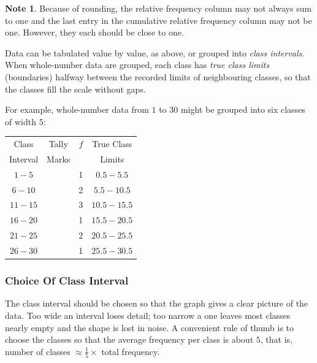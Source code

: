 \documentclass[11pt,a4paper]{article}
\newcommand{\tallystroke}[1]{\draw[line width=.7pt] (#1*0.16,0) -- (#1*0.16,0.32);}
\newcommand{\tallybox}[1]{%
  \raisebox{-0.02em}{\begin{tikzpicture}[baseline=0pt,inner sep=0pt]#1\end{tikzpicture}}%
}
\newcommand{\StrokeOne}  {\tallybox{\tallystroke{0}}}
\newcommand{\StrokeTwo}  {\tallybox{\tallystroke{0}\tallystroke{1}}}
\newcommand{\StrokeThree}{\tallybox{\tallystroke{0}\tallystroke{1}\tallystroke{2}}}
\theoremstyle{definition}
\newtheorem{note}[thm]{Note}
\begin{document}
\begin{note}
Because of rounding, the relative frequency column may not always sum to one and the last entry in the cumulative relative frequency column may not be one. However, they each should be close to one.\\[1ex]
\end{note}






Data can be tabulated value by value, as above, or grouped into \emph{class intervals}.
When whole-number data are grouped, each class has \emph{true class limits} (boundaries)
halfway between the recorded limits of neighbouring classes, so that the classes fill the
scale without gaps.

For example, whole-number data from $1$ to $30$ might be grouped into six classes of width $5$:







\begin{table}[H]
\centering
\begin{tabular}{|c|c|c|c|}
\hline Class & Tally & $f$ & True Class\\
Interval & Marks && Limits\\
\hline 
$1-5$   & \StrokeOne   & 1 & $0.5-5.5$\\
$6-10$  & \StrokeTwo   & 2 & $5.5-10.5$\\
$11-15$ & \StrokeThree & 3 & $10.5-15.5$\\
$16-20$ & \StrokeOne   & 1 & $15.5-20.5$\\
$21-25$ & \StrokeTwo   & 2 & $20.5-25.5$\\
$26-30$ & \StrokeOne   & 1 &$25.5-30.5$\\
 \hline
\end{tabular}
\end{table}





\vspace{0.6cm}

\subsubsection{Choice Of Class Interval}

The class interval should be chosen so that the graph gives a clear picture of the data.
Too wide an interval loses detail; too narrow a one leaves most classes nearly empty and the
shape is lost in noise. A convenient rule of thumb is to choose the classes so that the
average frequency per class is about $5$, that is, number of classes
$\approx\frac15\times$ total frequency.
\end{document}
